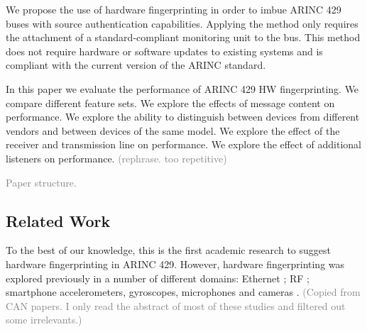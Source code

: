 \documentclass[conference]{IEEEtran}
\begin{document}
  We propose the use of hardware fingerprinting in order to imbue ARINC 429 buses with source authentication capabilities. Applying the method only requires the attachment of a standard-compliant monitoring unit to the bus. This method does not require hardware or software updates to existing systems and is compliant with the current version of the ARINC standard.
  
  In this paper we evaluate the performance of ARINC 429 HW fingerprinting. We compare different feature sets. We explore the effects of message content on performance. We explore the ability to distinguish between devices from different vendors and between devices of the same model. We explore the effect of the receiver and transmission line on performance. We explore the effect of additional listeners on performance. \textcolor{gray}{(rephrase. too repetitive)}
  
  \textcolor{gray}{Paper structure.}


\subsection{Related Work}
  To the best of our knowledge, this is the first academic research to suggest hardware fingerprinting in ARINC 429. However, hardware fingerprinting was explored previously in a number of different domains: Ethernet \cite{kohno2005remote, uluagac2013passive, gerdes2012physical}; RF \cite{ellis2001characteristics, hall2003detection, hall2005radio, ureten2007wireless, brik2008wireless, xu2015device}; smartphone accelerometers, gyroscopes, microphones and cameras \cite{lukavs2006digital, li2010source, dey2014accelprint, bojinov2014mobile, das2014you, das2016tracking}. \textcolor{gray}{(Copied from CAN papers. I only read the abstract of most of these studies and filtered out some irrelevants.)}
  
\end{document}
